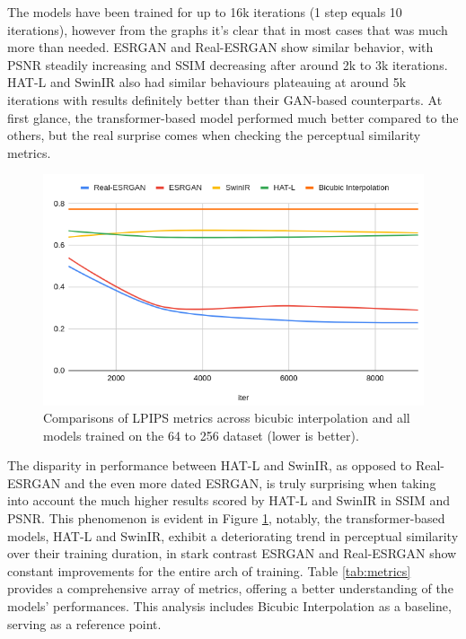 The models have been trained for up to 16k iterations (1 step equals 10 iterations), however from the graphs it's clear that in most cases that was much more than needed. ESRGAN and Real-ESRGAN show similar behavior, with PSNR steadily increasing and SSIM decreasing after around 2k to 3k iterations. HAT-L and SwinIR also had similar behaviours plateauing at around 5k iterations with results definitely better than their GAN-based counterparts. At first glance, the transformer-based model performed much better compared to the others, but the real surprise comes when checking the perceptual similarity metrics.


\begin{figure}[H]
  \centering
  \includegraphics[scale=0.4]{figures/LPIPS_2.png}
  \caption{Comparisons of LPIPS metrics across bicubic interpolation and all models trained on the 64 to 256 dataset (lower is better).}
  \label{img:lpips}
\end{figure}


The disparity in performance between HAT-L and SwinIR, as opposed to Real-ESRGAN and the even more dated ESRGAN, is truly surprising when taking into account the much higher results scored by HAT-L and SwinIR in SSIM and PSNR. This phenomenon is evident in Figure \ref{img:lpips}, notably, the transformer-based models, HAT-L and SwinIR, exhibit a deteriorating trend in perceptual similarity over their training duration, in stark contrast ESRGAN and Real-ESRGAN show constant improvements for the entire arch of training. Table \ref{tab:metrics} provides a comprehensive array of metrics, offering a better understanding of the models' performances. This analysis includes Bicubic Interpolation as a baseline, serving as a reference point.


